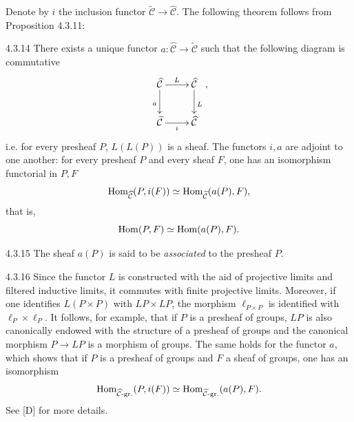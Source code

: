 Denote by \(i\) the inclusion functor
\(\widetilde{\mathcal C}\to\widehat{\mathcal C}\).
The following theorem follows from Proposition 4.3.11:

\begin{theorem}{4.3.14}\label{IV.4.3.14}
There exists a unique functor \(a:\widehat{\mathcal C}\to
\widetilde{\mathcal C}\) such that the following diagram is commutative
\[
\xymatrix{
\widehat{\mathcal C}\ar[r]^L\ar[d]_a & \widehat{\mathcal C}\ar[d]^L\\
\widetilde{\mathcal C}\ar[r]_i & \widehat{\mathcal C} },
\]
i.e. for every presheaf \(P\), \(L(L(P))\) is a sheaf.
The functors \(i,a\) are adjoint to one another: for every presheaf
\(P\) and every sheaf \(F\), one has an isomorphism functorial in \(P,F\)
\[
\operatorname{Hom}_{\widehat{\mathcal C}}(P,i(F))
\simeq\operatorname{Hom}_{\widetilde{\mathcal C}}(a(P),F),
\]
that is,
\[
\operatorname{Hom}(P,F)\simeq\operatorname{Hom}(a(P),F).
\]
\end{theorem}

\begin{definition}{4.3.15}\label{IV.4.3.15}
The sheaf \(a(P)\) is said to be \emph{associated} to the presheaf \(P\).
\end{definition}
\begin{remark}{4.3.16}\label{IV.4.3.16}
Since the functor \(L\) is constructed with the aid of projective
limits and filtered inductive limits, it commutes with finite
projective limits.
Moreover, if one identifies \(L(P\times P)\) with \(LP\times LP\),
the morphism \(\ell_{P\times P}\) is identified with
\(\ell_P\times\ell_P\). It follows, for example, that if \(P\) is a
presheaf of groups, \(LP\) is also canonically endowed with the
structure of a presheaf of groups and the canonical morphism
\(P\to LP\) is a morphism of groups. The same holds for the functor
\(a\), which shows that if \(P\) is a presheaf of groups and \(F\)
a sheaf of groups, one has an isomorphism
\[
\operatorname{Hom}_{\widehat{\mathcal C}\text{-gr.}}(P,i(F))
\simeq\operatorname{Hom}_{\widetilde{\mathcal C}\text{-gr.}}(a(P),F).
\]
See [D] for more details.
\end{remark}

